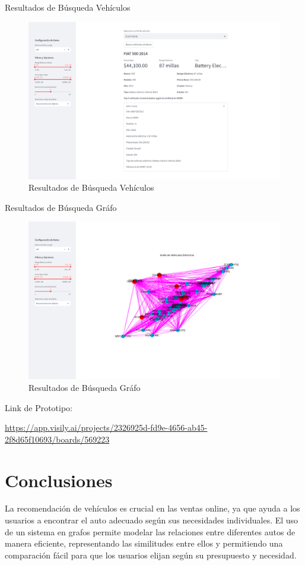 \documentclass[12pt]{article}
\begin{document}
Resultados de Búsqueda \- Vehículos
\begin{figure}[htbp]
    \centering
    \includegraphics[width=\textwidth]{./imgs-latex/img5.png}
    \caption{Resultados de Búsqueda \- Vehículos}
    \label{fig:img5}
\end{figure}

Resultados de Búsqueda \- Gráfo
\begin{figure}[htbp]
    \centering
    \includegraphics[width=\textwidth]{./imgs-latex/img6.png}
    \caption{Resultados de Búsqueda \- Gráfo}
    \label{fig:img6}
\end{figure}


Link de Prototipo:

\url{https://app.visily.ai/projects/2326925d-fd9e-4656-ab45-2f8d65f10693/boards/569223}


\section{Conclusiones}
La recomendación de vehículos es crucial en las ventas online, ya que ayuda a los usuarios a encontrar el auto adecuado según sus necesidades individuales. El uso de un sistema en grafos permite modelar las relaciones entre diferentes autos de manera eficiente, representando las similitudes entre ellos y permitiendo una comparación fácil para que los usuarios elijan según su presupuesto y necesidad.
\end{document}
